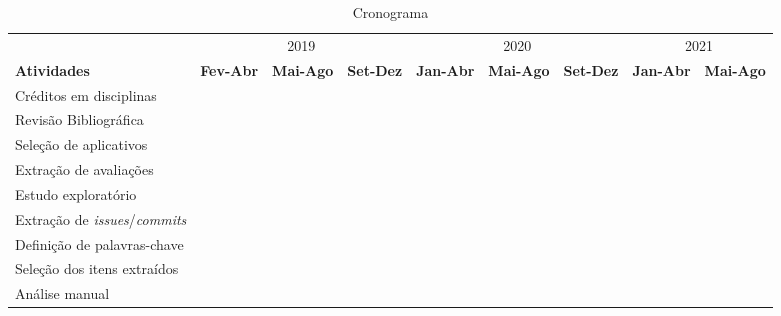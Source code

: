 \begin{table}[h] \footnotesize
\setlength{\tabcolsep}{0pt}
 \caption{Cronograma}
 \label{tab:cronograma}

\begin{tabular}{|l|c|c|c|c|c|c|c|c|}
  \cline{2-9}
  \multicolumn{1}{l|}{} & \multicolumn{3}{c|}{2019} & \multicolumn{3}{c|}{2020} & \multicolumn{2}{c|}{2021} \\
  \cline{1-9}
  \textbf{Atividades} &   
  \textbf{Fev-Abr\hspace{3pt}} &   
  \textbf{Mai-Ago\hspace{3pt}} & 
  \textbf{Set-Dez\hspace{3pt}} &
  \textbf{Jan-Abr\hspace{3pt}} &   
  \textbf{Mai-Ago\hspace{3pt}} & 
  \textbf{Set-Dez\hspace{3pt}} &
  \textbf{Jan-Abr\hspace{3pt}} &   
  \textbf{Mai-Ago\hspace{3pt}} \\ 
  \hline
  Créditos em disciplinas
  & \y & \x & \x & \x & \x  & \x & \x & \x \\
  \hline
  
  
  Revisão Bibliográfica
  & \y & \y & \y & \y & \x  & \y & \x & \x \\
  \hline
  
  
  Seleção de aplicativos
  & \x & \y & \x & \x & \x & \y & \x & \x \\
  \hline
  
  
  Extração de avaliações
  & \x & \y & \x & \x & \x  & \y & \x & \x \\
  \hline
  
  Estudo exploratório
  & \y & \y & \y & \x & \x  & \x & \x & \x \\
  \hline
  
  Extração de \textit{issues}/\textit{commits}
  & \x & \x & \x & \x & \x  & \y & \x & \x \\
  \hline
  
  Definição de palavras-chave 
  & \x & \y & \y & \x & \x  & \y & \x & \x \\
  \hline
  
  Seleção dos itens extraídos
  & \x & \x & \x & \x & \x  & \y & \x & \x \\
  \hline
  
  Análise manual 
  & \x & \x & \x & \x & \x  & \x & \y & \x \\
  \hline
  

\end{tabular}
\end{table}
